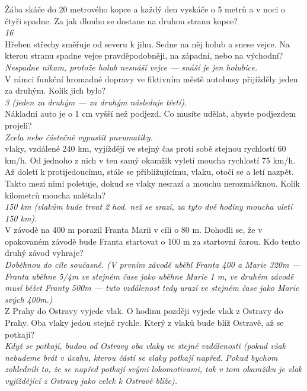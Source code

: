 \begin{multicols}{2}
\noindent
Žába skáče do 20 metrového kopce a každý den vyskáče o 5 
metrů a v noci o čtyři spadne. Za jak dlouho se dostane na druhou 
stranu kopce?\\[1 mm]
{\sl 16}\\

\noindent
Hřeben střechy směřuje od severu k jihu. Sedne na něj holub 
a snese vejce. Na kterou stranu spadne vejce pravděpodobněji, 
na západní, nebo na východní?\\[1 mm]
{\sl Nespadne nikam, protože holub nesnáší vejce --- snáší je 
jen holubice.}\\

\noindent
V rámci funkční hromadné dopravy ve fiktivním městě autobusy 
přijížděly jeden za druhým. Kolik jich bylo?\\[1 mm]
{\sl 3 (jeden za druhým --- za druhým následuje třetí).}\\

\noindent
Nákladní auto je o 1 cm vyšší než podjezd. Co musíte udělat, 
abyste podjezdem projeli?\\[1 mm]
{\sl Zcela nebo částečně vypustit pneumatiky.}\\

 vlaky, vzdálené 240 km, vyjíždějí ve stejný čas proti sobě 
stejnou rychlostí 60 km/h. Od jednoho z nich v ten samý okamžik 
vyletí moucha rychlostí 75 km/h. Až doletí k protijedoucímu, 
stále se přibližujícímu, vlaku, otočí se a letí nazpět. Takto 
mezi nimi poletuje, dokud se vlaky nesrazí a mouchu nerozmáčknou. 
Kolik kilometrů moucha nalétala?\\[1 mm]
{\sl 150 km (vlakům bude trvat 2 hod. než se srazí, za tyto dvě
hodiny moucha uletí 150 km).}\\

\noindent
V závodě na 400 m porazil Franta Marii v cíli o 80 m. Dohodli 
se, že v opakovaném závodě bude Franta startovat o 100 m za startovní 
čarou. Kdo tento druhý závod vyhraje?\\[1 mm]
{\sl Doběhnou do cíle současně. (V prvním závodě uběhl Franta 400 
a Marie 320m --- Franta uběhne 5/4m ve stejném čase jako uběhne 
Marie 1 m, ve druhém závodě musí běžet Franty 500m --- tuto vzdálenost 
tedy urazí ve stejném čase jako Marie svých 400m.)}\\

\noindent
Z Prahy do Ostravy vyjede vlak. O hodinu později vyjede vlak 
z Ostravy do Prahy. Oba vlaky jedou stejně rychle. Který z vlaků 
bude blíž Ostravě, až se potkají?\\[1 mm]
{\sl Když se potkají, budou od Ostravy oba vlaky ve stejné vzdálenosti 
(pokud však nebudeme brát v úvahu, kterou částí se vlaky potkají 
napřed. Pokud bychom zohlednili to, že se napřed potkají svými 
lokomotivami, tak v tom okamžiku je vlak vyjíždějící z Ostravy 
jako celek k Ostravě blíže).}\\


\end{multicols}
